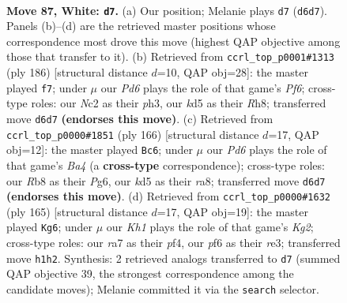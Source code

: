 \documentclass[11pt]{article}
\begin{document}
\clearpage

\begin{figure}[p]\centering
\begin{subfigure}{0.46\textwidth}\centering
\resizebox{\linewidth}{!}{%
\newchessgame
\chessboard[
  setfen={1R6/r5p1/3P1p2/3k3p/7P/6P1/2N5/7K w - - 1 87},
  showmover=false,
  pgfstyle=straightmove, color=movearrow, markmove={d6-d7}
]}
\caption{}
\end{subfigure}\hfill
\begin{subfigure}{0.46\textwidth}\centering
\resizebox{\linewidth}{!}{%
\newchessgame
\chessboard[
  setfen={7R/4K2p/5P2/p5k1/1p1r4/1P5p/P7/8 w - - 8 94},
  showmover=false,
  pgfstyle=straightmove, color=movearrow, markmove={f6-f7}
]}
\caption{}
\end{subfigure}
\\[4pt]
\begin{subfigure}{0.46\textwidth}\centering
\resizebox{\linewidth}{!}{%
\newchessgame
\chessboard[
  setfen={r7/4k3/4p1P1/3p1p2/B2P4/3NP3/6K1/8 w - - 8 84},
  showmover=false,
  pgfstyle=straightmove, color=movearrow, markmove={a4-c6}
]}
\caption{}
\end{subfigure}\hfill
\begin{subfigure}{0.46\textwidth}\centering
\resizebox{\linewidth}{!}{%
\newchessgame
\chessboard[
  setfen={8/6k1/4K3/5p1p/5P1P/4R1P1/8/3r4 b - - 12 83},
  showmover=false,
  pgfstyle=straightmove, color=movearrow, markmove={g7-g6}
]}
\caption{}
\end{subfigure}
\caption{\textbf{Move 87, White: \texttt{d7}.} (a) Our position; Melanie plays \texttt{d7} (\texttt{d6d7}). Panels (b)--(d) are the retrieved master positions whose correspondence most drove this move (highest QAP objective among those that transfer to it). (b) Retrieved from \texttt{ccrl\_top\_p0001\#1313} (ply 186) [structural distance $d$=10, QAP obj=28]: the master played \texttt{f7}; under $\mu$ our \emph{Pd6} plays the role of that game's \emph{Pf6}; cross-type roles: our \emph{N}c2 as their \emph{p}h3, our \emph{k}d5 as their \emph{R}h8; transferred move \texttt{d6d7} \textbf{(endorses this move)}. (c) Retrieved from \texttt{ccrl\_top\_p0000\#1851} (ply 166) [structural distance $d$=17, QAP obj=12]: the master played \texttt{Bc6}; under $\mu$ our \emph{Pd6} plays the role of that game's \emph{Ba4} (a \textbf{cross-type} correspondence); cross-type roles: our \emph{R}b8 as their \emph{P}g6, our \emph{k}d5 as their \emph{r}a8; transferred move \texttt{d6d7} \textbf{(endorses this move)}. (d) Retrieved from \texttt{ccrl\_top\_p0000\#1632} (ply 165) [structural distance $d$=17, QAP obj=19]: the master played \texttt{Kg6}; under $\mu$ our \emph{Kh1} plays the role of that game's \emph{Kg2}; cross-type roles: our \emph{r}a7 as their \emph{p}f4, our \emph{p}f6 as their \emph{r}e3; transferred move \texttt{h1h2}. Synthesis: 2 retrieved analogs transferred to \texttt{d7} (summed QAP objective 39, the strongest correspondence among the candidate moves); Melanie committed it via the \texttt{search} selector.}
\label{fig:thought-m172}
\end{figure}
\end{document}
